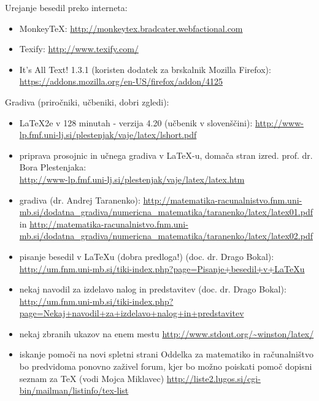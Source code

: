 Urejanje besedil preko interneta:
\begin{itemize}
\item MonkeyTeX: \url{http://monkeytex.bradcater.webfactional.com}
\item Texify: \url{http://www.texify.com/}
\item It's All Text! 1.3.1 (koristen dodatek za brskalnik Mozilla Firefox):\\
  \url{https://addons.mozilla.org/en-US/firefox/addon/4125}
\end{itemize}
\vspace{5mm}
Gradiva (priro\v cniki, u\v cbeniki, dobri zgledi):
\begin{itemize}
\item LaTeX2e v 128 minutah - verzija 4.20 (u\v cbenik v sloven\v s\v
  cini):
  \url{http://www-lp.fmf.uni-lj.si/plestenjak/vaje/latex/lshort.pdf}

\item priprava prosojnic in u\v cnega gradiva v \LaTeX-u, doma\v ca
  stran izred. prof. dr. Bora Plestenjaka:\\
  \url{http://www-lp.fmf.uni-lj.si/plestenjak/vaje/latex/latex.htm}
\item gradiva (dr. Andrej Taranenko):
  \url{http://matematika-racunalnistvo.fnm.uni-mb.si/dodatna_gradiva/numericna_matematika/taranenko/latex/latex01.pdf}
  in
  \url{http://matematika-racunalnistvo.fnm.uni-mb.si/dodatna_gradiva/numericna_matematika/taranenko/latex/latex02.pdf}
\item pisanje besedil v LaTeXu (dobra predloga!)  (doc. dr. Drago Bokal):
  \url{http://um.fnm.uni-mb.si/tiki-index.php?page=Pisanje+besedil+v+LaTeXu}
\item nekaj navodil za izdelavo nalog in predstavitev (doc. dr. Drago Bokal):
  \url{http://um.fnm.uni-mb.si/tiki-index.php?page=Nekaj+navodil+za+izdelavo+nalog+in+predstavitev}
\item nekaj zbranih ukazov na enem mestu
  \url{http://www.stdout.org/~winston/latex/}
\item iskanje pomo\v ci
  \subitem na novi spletni strani Oddelka za matematiko in ra\v
  cunalni\v stvo bo predvidoma ponovno za\v zivel forum, kjer bo mo\v
  zno poiskati pomo\v c
  \subitem dopisni seznam za TeX (vodi Mojca Miklavec)
  \url{http://liste2.lugos.si/cgi-bin/mailman/listinfo/tex-list}
\end{itemize}

